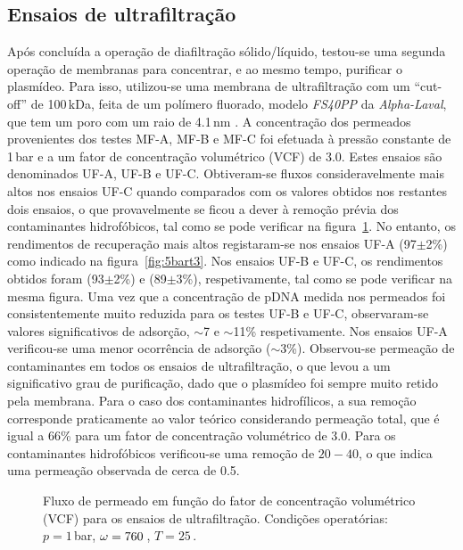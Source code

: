 \subsection{Ensaios de ultrafiltração}
\label{subsec:3p2art3}
%
Após concluída a operação de diafiltração sólido/líquido, testou-se uma segunda operação de membranas para concentrar, e ao mesmo tempo, purificar o plasmídeo. Para isso, utilizou-se uma membrana de ultrafiltração com um ``cut-off'' de 100\,kDa, feita de um polímero fluorado, modelo \emph{FS40PP} da \emph{Alpha-Laval}, que tem um poro com um raio de 4.1\,nm \cite{meu1}.
%
A concentração dos permeados provenientes dos testes MF-A, MF-B e MF-C foi efetuada à pressão constante de 1\,bar e a um fator de concentração volumétrico (VCF) de 3.0.
%
Estes ensaios são denominados UF-A, UF-B e UF-C.
%
%
%
%
%
%
Obtiveram-se fluxos consideravelmente mais altos nos ensaios UF-C quando comparados com os valores obtidos nos restantes dois ensaios, o que provavelmente se ficou a dever à remoção prévia dos contaminantes hidrofóbicos, tal como se pode verificar na figura~\ref{fig:5aart3}.
%
No entanto, os rendimentos de recuperação mais altos registaram-se nos ensaios UF-A (97$\pm$2\%) como indicado na figura~\ref{fig:5bart3}.
%
Nos ensaios UF-B e UF-C, os rendimentos obtidos foram (93$\pm$2\%) e (89$\pm$3\%), respetivamente, tal como se pode verificar na mesma figura. Uma vez que a concentração de pDNA medida nos permeados foi consistentemente muito reduzida para os testes UF-B e UF-C, observaram-se valores significativos de adsorção, $\sim$7 e $\sim$11\% respetivamente.
%
Nos ensaios UF-A verificou-se uma menor ocorrência de adsorção ($\sim$3\%). Observou-se permeação de contaminantes em todos os ensaios de ultrafiltração, o que levou a um significativo grau de purificação, dado que o plasmídeo foi sempre muito retido pela membrana.
%
Para o caso dos contaminantes hidrofílicos, a sua remoção corresponde praticamente ao valor teórico considerando permeação total, que é igual a 66\% para um fator de concentração volumétrico de 3.0. Para os contaminantes hidrofóbicos verificou-se uma remoção de $20-40$\porcento, o que indica uma permeação observada de cerca de 0.5. 
\begin{figure}
	\centering
	\setlength\figureheight{6cm} 
	\setlength\figurewidth{6cm}
	
	\caption[Fluxo de permeado em função do fator de concentração volumétrico (UF)]{Fluxo de permeado em função do fator de concentração volumétrico (VCF) para os ensaios de ultrafiltração. Condições operatórias: $p=1$\,bar, $\omega=760$\,\minmum, $T=25$\,\degreecelsius.}
	\label{fig:5aart3}
\end{figure}
